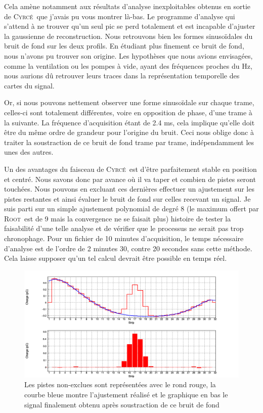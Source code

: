 \documentclass[a4paper,11pt]{article}
\newcommand{\cyrce}{\textsc{Cyrcé}}
\newcommand{\Root}{\textsc{Root}}
\begin{document}
Cela amène notamment aux résultats d'analyse inexploitables obtenus en sortie de \cyrce\ que j'avais pu vous montrer là-bas.
Le programme d'analyse qui s'attend à ne trouver qu'un seul pic se perd totalement et est incapable d'ajuster la gaussienne de reconstruction. 
Nous retrouvons bien les formes sinusoïdales du bruit de fond sur les deux profils.
En étudiant plus finement ce bruit de fond, nous n'avons pu trouver son origine. 
Les hypothèses que nous avions envisagées, comme la ventilation ou les pompes à vide, ayant des fréquences proches du Hz, nous aurions dû retrouver leurs traces dans la représentation temporelle des cartes du signal.

Or, si nous pouvons nettement observer une forme sinusoïdale sur chaque trame, celles-ci sont totalement différentes, voire en opposition de phase, d'une trame à la suivante. 
La fréquence d'acquisition étant de 2.4 ms, cela implique qu'elle doit être du même ordre de grandeur pour l'origine du bruit. 
Ceci nous oblige donc à traiter la soustraction de ce bruit de fond trame par trame, indépendamment les unes des autres.

Un des avantages du faisceau de \cyrce\ est d'être parfaitement stable en position et centré. 
Nous savons donc par avance où il va taper et combien de pistes seront touchées. 
Nous pouvons en excluant ces dernières effectuer un ajustement sur les pistes restantes et ainsi évaluer le bruit de fond sur celles recevant un signal. 
Je suis parti sur un simple ajustement polynomial de degré 8 (le maximum offert par \Root\ est de 9 mais la convergence ne se faisait plus) histoire de tester la faisabilité d'une telle analyse et de vérifier que le processus ne serait pas trop chronophage. 
Pour un fichier de 10 minutes d'acquisition, le temps nécessaire d'analyse est de l'ordre de 2 minutes 30, contre 20 secondes sans cette méthode. 
Cela laisse supposer qu'un tel calcul devrait être possible en temps réel.
\begin{figure}[h]
\begin{center}
\includegraphics[scale=0.4]{SFB_396.png} 
\caption{\label{fig:396}\footnotesize{Les pistes non-exclues sont représentées avec le rond rouge, la courbe bleue montre l'ajustement réalisé et le graphique en bas le signal finalement obtenu après soustraction de ce bruit de fond}}
\end{center}
\end{figure}
\end{document}

